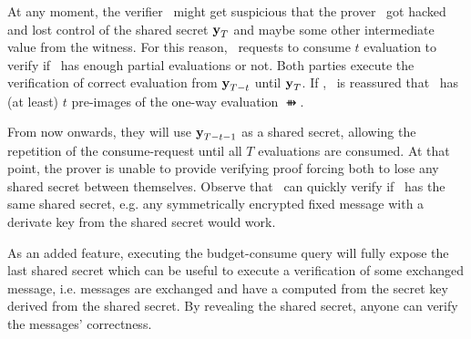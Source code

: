 At any moment, the verifier \advV\ might get suspicious that the prover \advP\ got hacked and
lost control of the shared secret $\vy[T]$ and maybe some other intermediate value from the witness.
For this reason, \advV\ requests to consume $t$ evaluation to verify if \advP\ has enough
partial evaluations or not.
Both parties execute the verification of correct evaluation from $\vy[T-t]$ until $\vy[T]$.
If \valid, \advV\ is reassured that \advP\ has (at least) $t$ pre-images of the one-way
evaluation $\ffun{}$.

From now onwards, they will use $\vy[T-t-1]$ as a shared secret, allowing the repetition of the 
consume-request until all $T$ evaluations are consumed.
At that point, the prover is unable to provide verifying proof forcing both to lose any shared
secret between themselves.
Observe that \advV\ can quickly verify if \advP\ has the same shared secret, e.g. any symmetrically 
encrypted fixed message with a derivate key from the shared secret would work.


As an added feature, executing the budget-consume query will fully expose the last shared secret
which can be useful to execute a verification of some exchanged message, i.e. messages are
exchanged and have a  computed from the secret key derived from the shared secret.
By revealing the shared secret, anyone can verify the messages' correctness.



\vspace{2mm}
